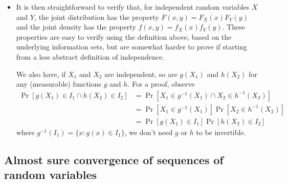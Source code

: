 \begin{itemize}[leftmargin=0pt]
\item It is then straightforward to verify that, for independent
  random variables $X$ and $Y$, the joint distribution has the
  property $F(x, y) = F_X(x) F_Y(y)$ and the joint density has the
  property $f(x,y) = f_X(x) f_Y(y)$.  These properties are easy to
  verify using the definition above, based on the underlying
  information sets, but are somewhat harder to prove if starting from
  a less abstract definition of independence.

  We also have, if $X_1$ and $X_2$ are independent, so are $g(X_1)$ and
  $h(X_2)$ for any (measurable) functions $g$ and $h$.  For a proof,
  observe
  \begin{align*}
    \Pr[g(X_1) \in I_1 \cap h(X_2) \in I_2]
    &= \Pr[X_1 \in g^{-1}(X_1) \cap X_2 \in h^{-1}(X_2)] \\
    &= \Pr[X_1 \in g^{-1}(X_1)] \Pr[X_2 \in h^{-1}(X_2)] \\
    &= \Pr[g(X_1) \in I_1] \Pr[h(X_2) \in I_2]
  \end{align*}
  where $g^{-1}(I_1) = \{x : g(x) \in I_1\}$, we don't need $g$ or $h$ to
  be invertible.

\end{itemize}

\subsection{Almost sure convergence of sequences of random variables}

